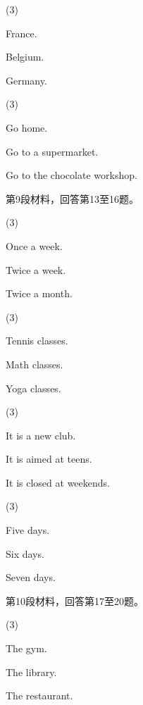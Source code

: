 \documentclass{英语试卷}
\begin{document}
\begin{choices}(3)
  \item France.
  \item Belgium.
  \item Germany.
\end{choices}
\begin{choices}(3)
  \item Go home.
  \item Go to a supermarket.
  \item Go to the chocolate workshop.
\end{choices}
\par 第9段材料，回答第13至16题。\par
{}
\begin{choices}(3)
  \item Once a week.
  \item Twice a week.
  \item Twice a month.
\end{choices}
\begin{choices}(3)
  \item Tennis classes.
  \item Math classes.
  \item Yoga classes.
\end{choices}
\begin{choices}(3)
  \item It is a new club.
  \item It is aimed at teens.
  \item It is closed at weekends.
\end{choices}
\begin{choices}(3)
  \item Five days.
  \item Six days.
  \item Seven days.
\end{choices}
\par 第10段材料，回答第17至20题。\par
{}
\begin{choices}(3)
  \item The gym.
  \item The library.
  \item The restaurant.
\end{choices}
\end{document}
